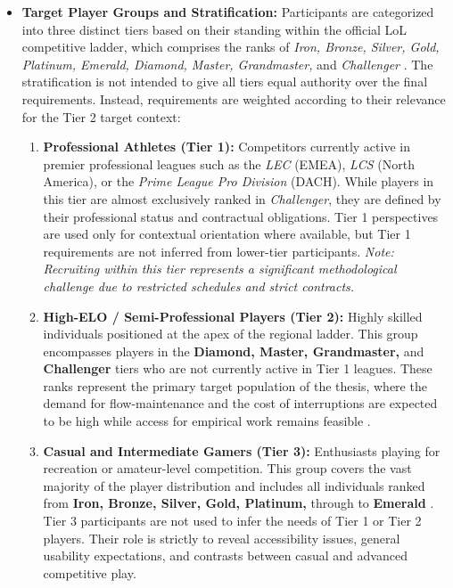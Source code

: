 \begin{itemize}
    \item \textbf{Target Player Groups and Stratification:} Participants are categorized into three distinct tiers based on their standing within the official LoL competitive ladder, which comprises the ranks of \textit{Iron, Bronze, Silver, Gold, Platinum, Emerald, Diamond, Master, Grandmaster,} and \textit{Challenger} \autocite{gong2020league}. The stratification is not intended to give all tiers equal authority over the final requirements. Instead, requirements are weighted according to their relevance for the Tier 2 target context:
    \begin{enumerate}
        \item \textbf{Professional Athletes (Tier 1):} Competitors currently active in premier professional leagues such as the \textit{LEC} (EMEA), \textit{LCS} (North America), or the \textit{Prime League Pro Division} (DACH). While players in this tier are almost exclusively ranked in \textit{Challenger}, they are defined by their professional status and contractual obligations. Tier 1 perspectives are used only for contextual orientation where available, but Tier 1 requirements are not inferred from lower-tier participants. \textit{Note: Recruiting within this tier represents a significant methodological challenge due to restricted schedules and strict contracts.}
        
        \item \textbf{High-ELO / Semi-Professional Players (Tier 2):} Highly skilled individuals positioned at the apex of the regional ladder. This group encompasses players in the \textbf{Diamond, Master, Grandmaster,} and \textbf{Challenger} tiers who are not currently active in Tier 1 leagues. These ranks represent the primary target population of the thesis, where the demand for flow-maintenance and the cost of interruptions are expected to be high while access for empirical work remains feasible \autocite{gong2020league}.
        
        \item \textbf{Casual and Intermediate Gamers (Tier 3):} Enthusiasts playing for recreation or amateur-level competition. This group covers the vast majority of the player distribution and includes all individuals ranked from \textbf{Iron, Bronze, Silver, Gold, Platinum,} through to \textbf{Emerald} \autocite{gong2020league}. Tier 3 participants are not used to infer the needs of Tier 1 or Tier 2 players. Their role is strictly to reveal accessibility issues, general usability expectations, and contrasts between casual and advanced competitive play.
    \end{enumerate}


\end{itemize}

